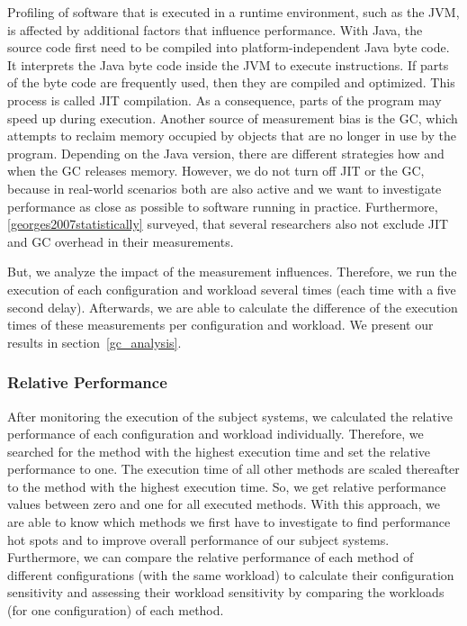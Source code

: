 
Profiling of software that is executed in a runtime environment, such as the \ac{JVM}, is affected by additional factors that influence performance. With Java, the source code first need to be compiled into platform-independent Java byte code. It interprets the Java byte code inside the \ac{JVM} to execute instructions. If parts of the byte code are frequently used, then they are compiled and optimized. This process is called \ac{JIT} compilation. As a consequence, parts of the program may speed up during execution. Another source of measurement bias is the \ac{GC}, which attempts to reclaim memory occupied by objects that are no longer in use by the program. Depending on the Java version, there are different strategies how and when the \ac{GC} releases memory. However, we do not turn off \ac{JIT} or the \ac{GC}, because in real-world scenarios both are also active and we want to investigate performance as close as possible to software running in practice. Furthermore, \ref{georges2007statistically} surveyed, that several researchers also not exclude \ac{JIT} and \ac{GC} overhead in their measurements.

But, we analyze the impact of the measurement influences. Therefore, we run the execution of each configuration and workload several times (each time with a five second delay). Afterwards, we are able to calculate the difference of the execution times of these measurements per configuration and workload. We present our results in section~\ref{gc_analysis}.


\subsubsection{Relative Performance}

After monitoring the execution of the subject systems, we calculated the relative performance of each configuration and workload individually. Therefore, we searched for the method with the highest execution time and set the relative performance to one. The execution time of all other methods are scaled thereafter to the method with the highest execution time. So, we get relative performance values between zero and one for all executed methods. With this approach, we are able to know which methods we first have to investigate to find performance hot spots and to improve overall performance of our subject systems. Furthermore, we can compare the relative performance of each method of different configurations (with the same workload) to calculate their configuration sensitivity and assessing their workload sensitivity by comparing the workloads (for one configuration) of each method.


